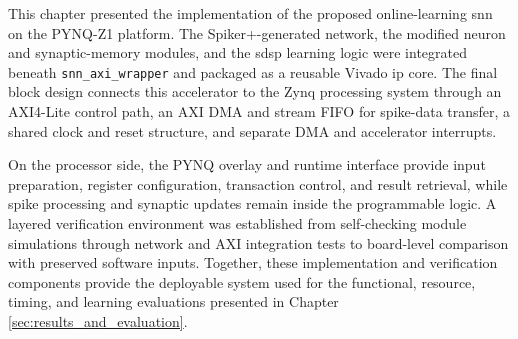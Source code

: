 This chapter presented the implementation of the proposed online-learning \gls{snn} on the PYNQ-Z1 platform. The Spiker+-generated network, the modified neuron and synaptic-memory modules, and the \gls{sdsp} learning logic were integrated beneath \texttt{snn\_axi\_wrapper} and packaged as a reusable Vivado \gls{ip} core. The final block design connects this accelerator to the Zynq processing system through an AXI4-Lite control path, an AXI DMA and stream FIFO for spike-data transfer, a shared clock and reset structure, and separate DMA and accelerator interrupts.

On the processor side, the PYNQ overlay and runtime interface provide input preparation, register configuration, transaction control, and result retrieval, while spike processing and synaptic updates remain inside the programmable logic. A layered verification environment was established from self-checking module simulations through network and AXI integration tests to board-level comparison with preserved software inputs. Together, these implementation and verification components provide the deployable system used for the functional, resource, timing, and learning evaluations presented in Chapter \ref{sec:results_and_evaluation}.

